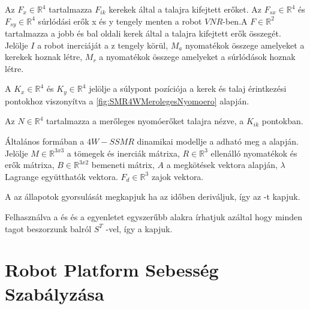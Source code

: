 \renewcommand{\img}{SajatRobot/SzerkAbrak/robot4wDinamic.jpg}
\renewcommand{\sources}{*}
\renewcommand{\captionn}{Kinematikai modell az $SSMR$ típusú $MR$ robotnak.}
\renewcommand{\figlabel}{SMR4WDinamicsModel}


Az $F_x \in \mathbb{R}^4$ tartalmazza $F_{ik}$ kerekek által a talajra kifejtett erőket. Az $F_{sx} \in \mathbb{R}^4$ és $F_{sy} \in \mathbb{R}^4$ súrlódási erők x és y tengely menten a robot $VNR$-ben.A $F \in \mathbb{R}^2$ tartalmazza a jobb és bal oldali kerek által a talajra kifejtett erők összegét. Jelölje $I$ a robot inerciáját a z tengely körül, $M_a$ nyomatékok összege amelyeket a kerekek hoznak létre, $M_r$ a nyomatékok összege amelyeket a súrlódások hoznak létre. 

A $K_x\in \mathbb{R}^4$ és $K_y\in \mathbb{R}^4$ jelölje a súlypont pozíciója a kerek és talaj érintkezési pontokhoz viszonyítva a \ref{fig:SMR4WMerolegesNyomoero} alapján.

Az $N \in \mathbb{R}^4$ tartalmazza a merőleges nyomóerőket talajra nézve, a $K_{ik}$ pontokban. 



Általános formában a $4W-SSMR$ dinamikai modellje a  adható meg a \cite{RobustMotionControl} alapján. Jelölje $M \in \mathbb{R}^{3x3}$ a tömegek és inerciák mátrixa, $R \in \mathbb{R}^{3}$ ellenálló nyomatékok és erők mátrixa,  $B \in \mathbb{R}^{3x2}$ bemeneti mátrix, $A$ a megkötések vektora  alapján, $\lambda$ Lagrange együtthatók vektora. $F_d \in \mathbb{R}^{3}$ zajok vektora.

A   az állapotok gyorsulását megkapjuk ha az  időben deriváljuk, így az -t kapjuk.

Felhasználva a   és  és  a  egyenletet egyszerűbb alakra írhatjuk azáltal hogy minden tagot beszorzunk balról $S^T$ -vel, így a  kapjuk.




\section{Robot Platform Sebesség Szabályzása}


